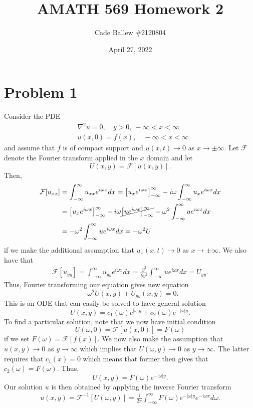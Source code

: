 \documentclass{article}
\title{AMATH 569 Homework 2}
\author{Cade Ballew \#2120804}
\date{April 27, 2022}
\begin{document}
	
\maketitle
	
\section{Problem 1}
Consider the PDE 
\begin{align*}
&\nabla^2u=0, \quad y>0,~ -\infty<x<\infty\\
&u(x,0)=f(x), \quad -\infty<x<\infty
\end{align*}
and assume that $f$ is of compact support and $u(x,t)\to0$ as $x\to\pm\infty$. Let $\mathcal{F}$ denote the Fourier transform applied in the $x$ domain and let
\[
U(x,y)=\mathcal{F}[u(x,y)].
\]
Then, 
\begin{align*}
\mathcal{F}[u_{xx}]&=\int_{-\infty}^\infty u_{xx}e^{i\omega x}dx=\left[u_xe^{i\omega x}\right]_{-\infty}^\infty-i\omega\int_{-\infty}^\infty u_{x}e^{i\omega x}dx\\&=\left[u_xe^{i\omega x}\right]_{-\infty}^\infty-i\omega\cancel{\left[ue^{i\omega x}\right]_{-\infty}^\infty}-\omega^2\int_{-\infty}^\infty ue^{i\omega x}dx\\&=
-\omega^2\int_{-\infty}^\infty ue^{i\omega x}dx=-\omega^2U
\end{align*}
if we make the additional assumption that $u_x(x,t)\to0$ as $x\to\pm\infty$. We also have that 
\begin{align*}
\mathcal{F}[u_{yy}]=\int_{-\infty}^\infty u_{yy}e^{i\omega x}dx=\frac{\partial^2}{\partial y^2}\int_{-\infty}^\infty ue^{i\omega x}dx=U_{yy}.
\end{align*}
Thus, Fourier transforming our equation gives new equation
\[
-\omega^2U(x,y)+U_{yy}(x,y)=0.
\]
This is an ODE that can easily be solved to have general solution
\[
U(x,y)=c_1(\omega)e^{|\omega|y}+c_2(\omega)e^{-|\omega|y}.
\]
To find a particular solution, note that we now have initial condition
\[
U(\omega,0)=\mathcal{F}[u(x,0)]=F(\omega)
\]
if we set $F(\omega)=\mathcal{F}[f(x)]$. We now also make the assumption that $u(x,y)\to0$ as $y\to\infty$ which implies that $U(\omega,y)\to0$ as $y\to\infty$. The latter requires that $c_1(x)=0$ which means that former then gives that $c_2(\omega)=F(\omega)$. Thus, 
\[
U(x,y)=F(\omega)e^{-|\omega|y}.
\]
Our solution $u$ is then obtained by applying the inverse Fourier transform 
\begin{align*}
u(x,y)=\mathcal{F}^{-1}[U(\omega,y)]=\frac{1}{2\pi}\int_{-\infty}^\infty F(\omega)e^{-|\omega|y}e^{-i\omega x}d\omega.
\end{align*}
\end{document}
